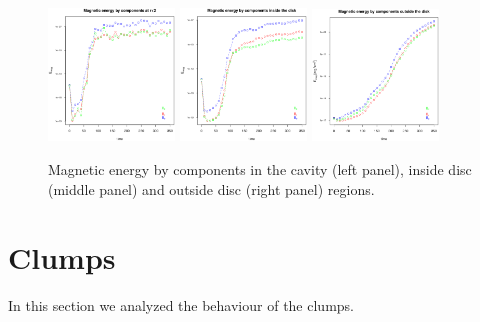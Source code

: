 \documentclass[a4paper,12pt]{article}
\begin{document}
\begin{figure}[!ht]
 \begin{center}
  \includegraphics[width=0.3\textwidth]{figs/comp_em_vs_t_outflow.eps}
  \includegraphics[width=0.3\textwidth]{figs/comp_em_vs_t_disco.eps}
  \includegraphics[width=0.3\textwidth]{figs/comp_em_vs_t_outside.eps}
  \caption{Magnetic energy by components in the cavity (left panel), inside disc (middle panel) and outside disc (right panel) regions.}
 \label{energies}
 \end{center}
\end{figure}

\section{Clumps}

In this section we analyzed the behaviour of the clumps.
\end{document}
